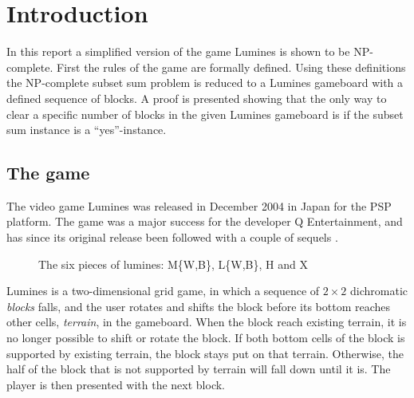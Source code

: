 \section{Introduction}

In this report a simplified version of the game Lumines is shown to be NP-complete. First the rules of the game are formally defined. Using these definitions the NP-complete subset sum problem is reduced to a Lumines gameboard with a defined sequence of blocks. A proof is presented showing that the only way to clear a specific number of blocks in the given Lumines gameboard is if the subset sum instance is a ``yes''-instance.

\subsection{The game}
The video game Lumines was released in December 2004 in Japan for the PSP platform. The game was a major success for the developer Q Entertainment, and has since its original release been followed with a couple of sequels \cite{wiki:lumines}.
\begin{figure}[H]
    \centering
    \caption{The six pieces of lumines: M\{W,B\}, L\{W,B\}, H and X}
    \label{fig:pieces}
\end{figure}

Lumines is a two-dimensional grid game, in which a sequence of $2 \times 2$ dichromatic \textit{blocks} falls, and the user rotates and shifts the block before its bottom  reaches other cells, \textit{terrain}, in the gameboard. When the block reach existing terrain, it is no longer possible to shift or rotate the block. If both bottom cells of the block is supported by existing terrain, the block stays put on that terrain. Otherwise, the half of the block that is not supported by terrain will fall down until it is. The player is then presented with the next block.

